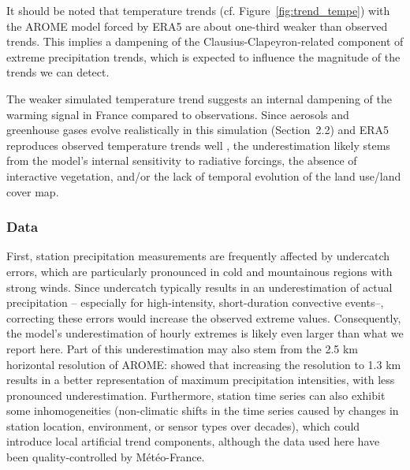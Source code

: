 \documentclass[hess, manuscript]{copernicus}
\begin{document}
It should be noted that temperature trends (cf. Figure~\ref{fig:trend_tempe}) with the AROME model forced by ERA5 are about one-third weaker than observed trends. This implies a dampening of the Clausius-Clapeyron-related component of extreme precipitation trends, which is expected to influence the magnitude of the trends we can detect.

The weaker simulated temperature trend suggests an internal dampening of the warming signal in France compared to observations. Since aerosols and greenhouse gases evolve realistically in this simulation (Section~2.2) and ERA5 reproduces observed temperature trends well \citep{hersbach2020era5}, the underestimation likely stems from the model's internal sensitivity to radiative forcings, the absence of interactive vegetation, and/or the lack of temporal evolution of the land use/land cover map.

\subsubsection{Data}\label{precipitation-limitations}

First, station precipitation measurements are frequently affected by undercatch errors, which are particularly pronounced in cold and mountainous regions with strong winds. Since undercatch typically results in an underestimation of actual precipitation -- especially for high-intensity, short-duration convective events--, correcting  these errors would increase the observed extreme values. Consequently, the model's underestimation of hourly extremes is likely even larger than what we report here. Part of this underestimation may also stem from the 2.5 km horizontal resolution of AROME: \citet{brousseau-etal-2016} showed that increasing the resolution to 1.3 km results in a better representation of maximum precipitation intensities, with less pronounced underestimation. Furthermore, station time series can also exhibit some inhomogeneities (non-climatic shifts in the time series caused by changes in station location, environment, or sensor types over decades), which could introduce local artificial trend components, although the data used here have been quality-controlled by Météo-France.
\end{document}
